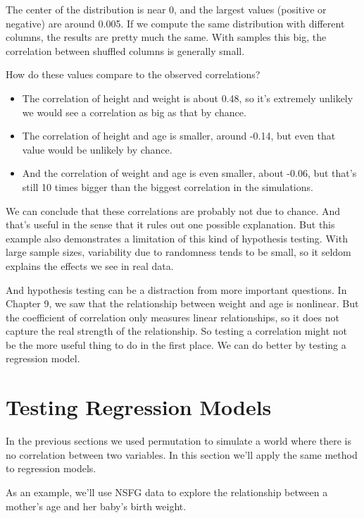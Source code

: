 The center of the distribution is near 0, and the largest values
(positive or negative) are around 0.005. If we compute the same
distribution with different columns, the results are pretty much the
same. With samples this big, the correlation between shuffled columns is
generally small.

How do these values compare to the observed correlations?

\begin{itemize}
\item
  The correlation of height and weight is about 0.48, so it's extremely
  unlikely we would see a correlation as big as that by chance.
\item
  The correlation of height and age is smaller, around -0.14, but even
  that value would be unlikely by chance.
\item
  And the correlation of weight and age is even smaller, about -0.06,
  but that's still 10 times bigger than the biggest correlation in the
  simulations.
\end{itemize}

We can conclude that these correlations are probably not due to chance.
And that's useful in the sense that it rules out one possible
explanation. But this example also demonstrates a limitation of this
kind of hypothesis testing. With large sample sizes, variability due to
randomness tends to be small, so it seldom explains the effects we see
in real data.

And hypothesis testing can be a distraction from more important
questions. In Chapter 9, we saw that the relationship between weight and
age is nonlinear. But the coefficient of correlation only measures
linear relationships, so it does not capture the real strength of the
relationship. So testing a correlation might not be the more useful
thing to do in the first place. We can do better by testing a regression
model.

\hypertarget{testing-regression-models}{%
\section{Testing Regression Models}\label{testing-regression-models}}

In the previous sections we used permutation to simulate a world where
there is no correlation between two variables. In this section we'll
apply the same method to regression models.

As an example, we'll use NSFG data to explore the relationship between a
mother's age and her baby's birth weight.

